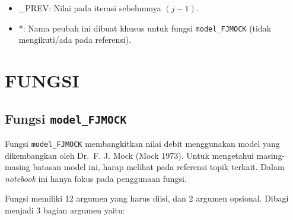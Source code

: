 \documentclass[11pt]{article}
\providecommand{\tightlist}{%
      \setlength{\itemsep}{0pt}\setlength{\parskip}{0pt}}
\begin{document}
\begin{itemize}
\tightlist
\item
  \_PREV: Nilai pada iterasi sebelumnya \((j-1)\).
\item
  *: Nama peubah ini dibuat khusus untuk fungsi \texttt{model\_FJMOCK}
  (tidak mengikuti/ada pada referensi).
\end{itemize}

    \hypertarget{fungsi}{%
\section{FUNGSI}\label{fungsi}}

    \hypertarget{fungsi-model_fjmock}{%
\subsection{\texorpdfstring{Fungsi
\texttt{model\_FJMOCK}}{Fungsi model\_FJMOCK}}\label{fungsi-model_fjmock}}

Fungsi \texttt{model\_FJMOCK} membangkitkan nilai debit menggunakan
model yang dikembangkan oleh Dr.~F. J. Mock (Mock 1973). Untuk
mengetahui masing-masing batasan model ini, harap melihat pada referensi
topik terkait. Dalam \emph{notebook} ini hanya fokus pada penggunaan
fungsi.

Fungsi memiliki 12 argumen yang harus diisi, dan 2 argumen opsional.
Dibagi menjadi 3 bagian argumen yaitu:
\end{document}
